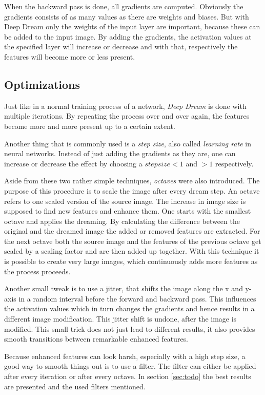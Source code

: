 When the backward pass is done, all gradients are computed.
Obviously the gradients consists of as many values as there are weights and biases.
But with Deep Dream only the weights of the input layer are important, because these can be added to the input image.
By adding the gradients, the activation values at the specified layer will increase or decrease and with that, respectively the features will become more or less present.

\subsection{Optimizations}
\label{sec:optimizations}
Just like in a normal training process of a network, \emph{Deep Dream} is done with multiple iterations.
By repeating the process over and over again, the features become more and more present up to a certain extent.

Another thing that is commonly used is a \emph{step size}, also called \emph{learning rate} in neural networks.
Instead of just adding the gradients as they are, one can increase or decrease the effect by choosing a $step size < 1$ and $> 1$ respectively.

Aside from these two rather simple techniques, \emph{octaves} were also introduced.
The purpose of this procedure is to scale the image after every dream step.
An octave refers to one scaled version of the source image.
The increase in image size is supposed to find new features and enhance them.
One starts with the smallest octave and applies the dreaming.
By calculating the difference between the original and the dreamed image the added or removed features are extracted.
For the next octave both the source image and the features of the previous octave get scaled by a scaling factor and are then added up together.
With this technique it is possible to create very large images, which continuously adds more features as the process proceeds.

 
Another small tweak is to use a jitter, that shifts the image along the x and y-axis in a random interval before the forward and backward pass.
This influences the activation values which in turn changes the gradients and hence results in a different image modification.
This jitter shift is undone, after the image is modified.
This small trick does not just lead to different results, it also provides smooth transitions between remarkable enhanced features.

Because enhanced features can look harsh, especially with a high step size, a good way to smooth things out is to use a filter. 
The filter can either be applied after every iteration or after every octave.
In section \ref{sec:todo} the best results are presented and the used filters mentioned.


